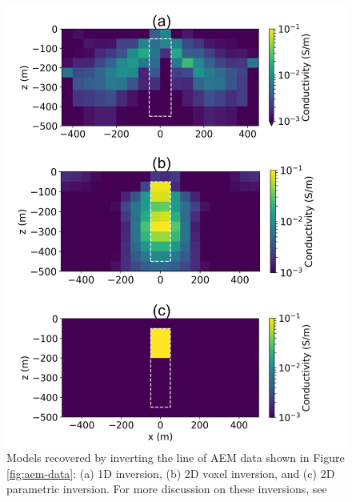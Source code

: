 \begin{figure}
    \begin{center}
    \includegraphics[width=0.55\columnwidth]{figures/aem-inversions.png}
    \end{center}
\caption{
    Models recovered by inverting the line of AEM data shown in Figure \ref{fig:aem-data}:
    (a) 1D inversion, (b) 2D voxel inversion, and (c) 2D parametric inversion. For more discussion
    on these inversions, see \cite{Heagy2018}
}
\label{fig:aem-inversions}
\end{figure}


